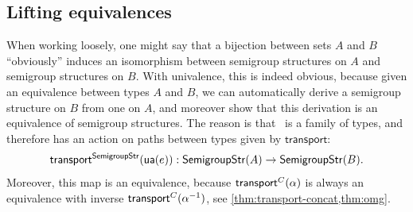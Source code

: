 \subsection{Lifting equivalences}

%
When working loosely, one might say that a bijection between sets $A$
and $B$ ``obviously'' induces an isomorphism between semigroup
structures on $A$ and semigroup structures on $B$.  With univalence,
this is indeed obvious, because given an equivalence between types $A$
and $B$, we can automatically derive a semigroup structure on $B$ from
one on $A$, and moreover show that this derivation is an equivalence of
semigroup structures.  The reason is that \semigroupstrsym\ is a family
of types, and therefore has an action on paths between types given by
$\mathsf{transport}$:
\[
\mathsf{transport}^{\mathsf{SemigroupStr}}{(\mathsf{ua}(e))} : \mathsf{SemigroupStr}(A) \to \mathsf{SemigroupStr}(B).
\]
Moreover, this map is an equivalence, because
$\mathsf{transport}^{C}(\alpha)$ is always an equivalence with inverse
$\mathsf{transport}^{C}{(\mathord{{\alpha}^{-1}})}$, see \cref{thm:transport-concat,thm:omg}.

